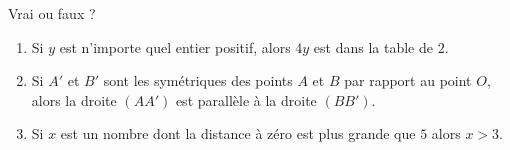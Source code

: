 
\begin{exercice}\label{exo2smath-0164}

    Vrai ou faux ?
    \begin{enumerate}
        \item
            Si \( y\) est n'importe quel entier positif, alors \( 4y\) est dans la table de \( 2\).
        \item
            Si \( A'\) et \( B'\) sont les symétriques des points \( A\) et \( B\) par rapport au point \( O\), alors la droite \( (AA')\) est parallèle à la droite \( (BB')\).
        \item
            Si \( x\) est un nombre dont la distance à zéro est plus grande que \( 5\) alors \( x>3\).
    \end{enumerate}

\end{exercice}
